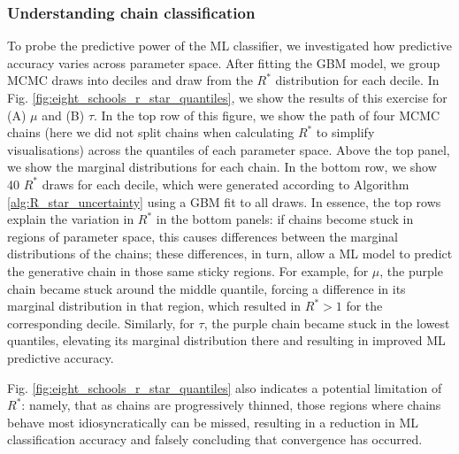 \documentclass{article}
\begin{document}
\subsubsection{Understanding chain classification}
To probe the predictive power of the ML classifier, we investigated how predictive accuracy varies across parameter space. After fitting the GBM model, we group MCMC draws into deciles and draw from the $R^*$ distribution for each decile. In Fig. \ref{fig:eight_schools_r_star_quantiles}, we show the results of this exercise for (A) $\mu$ and (B) $\tau$. In the top row of this figure, we show the path of four MCMC chains (here we did not split chains when calculating $R^*$ to simplify visualisations) across the quantiles of each parameter space. Above the top panel, we show the marginal distributions for each chain. In the bottom row, we show 40 $R^*$ draws for each decile, which were generated according to Algorithm \ref{alg:R_star_uncertainty} using a GBM fit to all draws. In essence, the top rows explain the variation in $R^*$ in the bottom panels: if chains become stuck in regions of parameter space, this causes differences between the marginal distributions of the chains; these differences, in turn, allow a ML model to predict the generative chain in those same sticky regions. For example, for $\mu$, the purple chain became stuck around the middle quantile, forcing a difference in its marginal distribution in that region, which resulted in $R^*>1$ for the corresponding decile. Similarly, for $\tau$, the purple chain became stuck in the lowest quantiles, elevating its marginal distribution there and resulting in improved ML predictive accuracy.

Fig. \ref{fig:eight_schools_r_star_quantiles} also indicates a potential limitation of $R^*$: namely, that as chains are progressively thinned, those regions where chains behave most idiosyncratically can be missed, resulting in a reduction in ML classification accuracy and falsely concluding that convergence has occurred.
\end{document}
